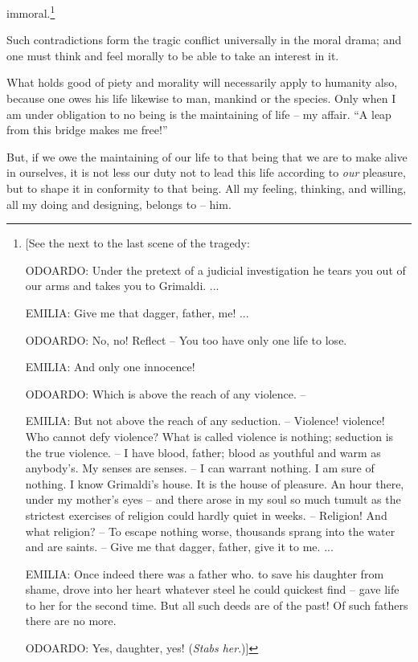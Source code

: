 immoral.\footnote{[See the next to the last scene of the tragedy:

ODOARDO: Under the pretext of a judicial investigation he tears you out of our 
arms and takes you to Grimaldi. ...

EMILIA: Give me that dagger, father, me! ...

ODOARDO: No, no! Reflect -- You too have only one life to lose.

EMILIA: And only one innocence!

ODOARDO: Which is above the reach of any violence. --

EMILIA: But not above the reach of any seduction. -- Violence! violence! Who 
cannot defy violence? What is called violence is nothing; seduction is the 
true violence. -- I have blood, father; blood as youthful and warm as 
anybody's. My senses are senses. -- I can warrant nothing. I am sure of 
nothing. I know Grimaldi's house. It is the house of pleasure. An hour there, 
under my mother's eyes -- and there arose in my soul so much tumult as the 
strictest exercises of religion could hardly quiet in weeks. -- Religion! And 
what religion? -- To escape nothing worse, thousands sprang into the water and 
are saints. -- Give me that dagger, father, give it to me. ...

EMILIA: Once indeed there was a father who. to save his daughter from shame, 
drove into her heart whatever steel he could quickest find -- gave life to her 
for the second time. But all such deeds are of the past! Of such fathers there 
are no more.

ODOARDO: Yes, daughter, yes! (\textit{Stabs her}.)]

}

Such contradictions form the tragic conflict universally in the moral drama; 
and one must think and feel morally to be able to take an interest in it.

What holds good of piety and morality will necessarily apply to humanity also, 
because one owes his life likewise to man, mankind or the species. Only when I 
am under obligation to no being is the maintaining of life -- my affair. ``A 
leap from this bridge makes me free!''

But, if we owe the maintaining of our life to that being that we are to make 
alive in ourselves, it is not less our duty not to lead this life according to 
\textit{our} pleasure, but to shape it in conformity to that being. All my 
feeling, thinking, and willing, all my doing and designing, belongs to -- him.


